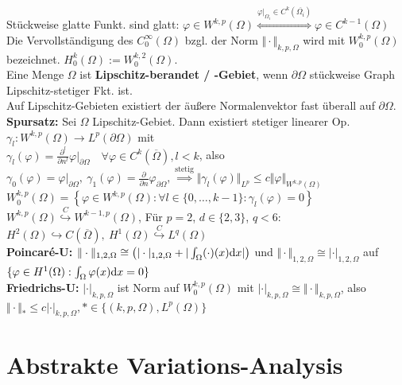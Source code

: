 \documentclass[12pt]{scrartcl}
\begin{document}
	Stückweise glatte Funkt. sind glatt:
	$\varphi\in W^{k,p}(\Omega)\overset{\varphi|_{\Omega_i}\in C^k(\overline{\Omega_i})}{\Longleftrightarrow}\varphi\in C^{k-1}(\Omega)$\\
	Die Vervollständigung des $C_0^\infty(\Omega)$ bzgl. der Norm $\Vert\cdot\Vert_{k,p,\Omega}$ wird mit $W_0^{k,p}(\Omega)$ bezeichnet.
	$H_0^k(\Omega):=W_0^{k,2}(\Omega)$.\\
	Eine Menge $\Omega$ ist \textbf{Lipschitz-berandet / -Gebiet}, wenn $\partial\Omega$ stückweise Graph Lipschitz-stetiger Fkt. ist.\\
	Auf Lipschitz-Gebieten existiert der äußere Normalenvektor fast überall auf $\partial\Omega$.\\
	\textbf{Spursatz:} Sei $\Omega$ Lipschitz-Gebiet. Dann existiert stetiger linearer Op. $\gamma_l:W^{k,p}(\Omega)\rightarrow L^p(\partial\Omega)$ mit\\ 
	$\gamma_l(\varphi)=\frac{\partial^l}{\partial n^l}\varphi|_{\partial\Omega}\quad\forall\varphi\in C^k(\overline{\Omega}),l<k$, also $\gamma_0(\varphi)=\varphi|_{\partial\Omega},~\gamma_1(\varphi)=\frac{\partial}{\partial n}\varphi_{\partial\Omega},\overset{\text{stetig}}{\implies}
	\Vert\gamma_l(\varphi)\Vert_{L^p}\leq c\Vert\varphi\Vert_{W^{k,p}(\Omega)}$\\
	$W_0^{k,p}(\Omega)=\left\lbrace\varphi\in W^{k,p}(\Omega):
		\forall l\in\lbrace0,\ldots,k-1\rbrace:\gamma_l(\varphi)=0\right\rbrace$\\
	$W^{k,p}(\Omega)\stackrel{C}{\hookrightarrow} W^{k-1,p}(\Omega)$, 
	Für $p=2$, $d\in\lbrace2,3\rbrace$, $q<6$:
	$H^2(\Omega)\hookrightarrow C(\overline{\Omega}),~H^1(\Omega)\stackrel{C}{\hookrightarrow} L^q(\Omega)$\\
	\textbf{Poincaré-U:} $\Vert\cdot\Vert_{1,2,\Omega}\cong\big(|\cdot|_{1,2,\Omega}+|\int_\Omega(\cdot)(x)\mathrm{d} x|\big)$ und $\Vert\cdot\Vert_{1,2,\Omega}\cong|\cdot|_{1,2,\Omega}$ auf $\lbrace\varphi\in H^1(\Omega):\int_\Omega \varphi(x)\mathrm{d} x=0\rbrace$\\
	\textbf{Friedrichs-U:} $|\cdot|_{k,p,\Omega}$ ist Norm auf $W_0^{k,p}(\Omega)$ mit $|\cdot|_{k,p,\Omega}\cong\Vert\cdot\Vert_{k,p,\Omega}$, also $\Vert\cdot\Vert_\ast\leq c|\cdot|_{k,p,\Omega},*\in\lbrace(k,p,\Omega),L^p(\Omega)\rbrace$
	
	\section{Abstrakte Variations-Analysis}
	
\end{document}

